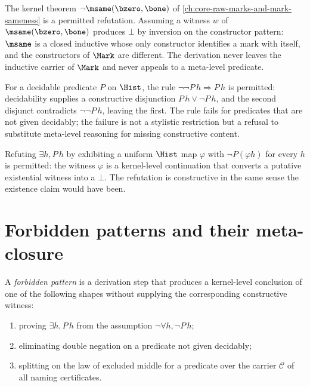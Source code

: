 \begin{example}
\label{ex:reasoning-negation-by-falsity}
The kernel theorem $\neg \msame(\bzero, \bone)$ of \autoref{ch:core-raw-marks-and-mark-sameness} is a permitted refutation. Assuming a witness $w$ of $\msame(\bzero, \bone)$ produces $\bot$ by inversion on the constructor pattern: $\msame$ is a closed inductive whose only constructor identifies a mark with itself, and the constructors of $\Mark$ are different. The derivation never leaves the inductive carrier of $\Mark$ and never appeals to a meta-level predicate.
\end{example}

\begin{example}
\label{ex:reasoning-double-negation-decidable}
For a decidable predicate $P$ on $\Hist$, the rule $\neg \neg P\,h \Rightarrow P\,h$ is permitted: decidability supplies a constructive disjunction $P\,h \vee \neg P\,h$, and the second disjunct contradicts $\neg \neg P\,h$, leaving the first. The rule fails for predicates that are not given decidably; the failure is not a stylistic restriction but a refusal to substitute meta-level reasoning for missing constructive content.
\end{example}

\begin{example}
\label{ex:reasoning-counterexample}
Refuting $\exists h, P\,h$ by exhibiting a uniform $\Hist$ map $\varphi$ with $\neg P(\varphi h)$ for every $h$ is permitted: the witness $\varphi$ is a kernel-level continuation that converts a putative existential witness into a $\bot$. The refutation is constructive in the same sense the existence claim would have been.
\end{example}

\section{Forbidden patterns and their meta-closure}
\label{sec:reasoning-forbidden-patterns}

\begin{definition}
\label{def:reasoning-forbidden-pattern}
A \emph{forbidden pattern} is a derivation step that produces a kernel-level conclusion of one of the following shapes without supplying the corresponding constructive witness:
\begin{enumerate}
\item proving $\exists h, P\,h$ from the assumption $\neg \forall h, \neg P\,h$;
\item eliminating double negation on a predicate not given decidably;
\item splitting on the law of excluded middle for a predicate over the carrier $\mathcal{C}$ of all naming certificates.
\end{enumerate}
\end{definition}

